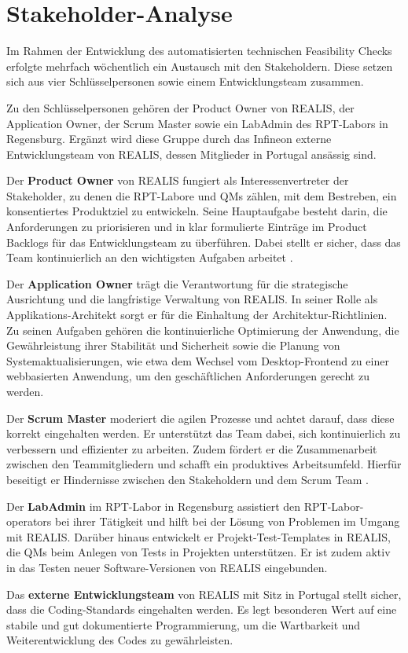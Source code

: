 \section{Stakeholder-Analyse}
Im Rahmen der Entwicklung des automatisierten technischen Feasibility Checks erfolgte mehrfach wöchentlich ein Austausch mit den Stakeholdern. Diese setzen sich aus vier Schlüsselpersonen sowie einem Entwicklungsteam zusammen.

Zu den Schlüsselpersonen gehören der Product Owner von \gls{REALIS}, der Application Owner, der Scrum Master sowie ein LabAdmin des \gls{RPT}-Labors in Regensburg. Ergänzt wird diese Gruppe durch das Infineon externe Entwicklungsteam von \gls{REALIS}, dessen Mitglieder in Portugal ansässig sind.

Der \textbf{Product Owner} von \gls{REALIS} fungiert als Interessenvertreter der Stakeholder, zu denen die \gls{RPT}-Labore und \glspl{QM} zählen, mit dem Bestreben, ein konsentiertes Produktziel zu entwickeln. Seine Hauptaufgabe besteht darin, die Anforderungen zu priorisieren und in klar formulierte Einträge im Product Backlogs für das Entwicklungsteam zu überführen. Dabei stellt er sicher, dass das Team kontinuierlich an den wichtigsten Aufgaben arbeitet \cite{scrumguide2020}.

Der \textbf{Application Owner} trägt die Verantwortung für die strategische Ausrichtung und die langfristige Verwaltung von \gls{REALIS}. In seiner Rolle als Applikations-Architekt sorgt er für die Einhaltung der Architektur-Richtlinien. Zu seinen Aufgaben gehören die kontinuierliche Optimierung der Anwendung, die Gewährleistung ihrer Stabilität und Sicherheit sowie die Planung von Systemaktualisierungen, wie etwa dem Wechsel vom Desktop-Frontend zu einer webbasierten Anwendung, um den geschäftlichen Anforderungen gerecht zu werden.

Der \textbf{Scrum Master} moderiert die agilen Prozesse und achtet darauf, dass diese korrekt eingehalten werden. Er unterstützt das Team dabei, sich kontinuierlich zu verbessern und effizienter zu arbeiten. Zudem fördert er die Zusammenarbeit zwischen den Teammitgliedern und schafft ein produktives Arbeitsumfeld. Hierfür beseitigt er Hindernisse zwischen den Stakeholdern und dem Scrum Team \cite{scrumguide2020}.

Der \textbf{LabAdmin} im \gls{RPT}-Labor in Regensburg assistiert den \gls{RPT}-Labor-\glspl{operator} bei ihrer Tätigkeit und hilft bei der Lösung von Problemen im Umgang mit \gls{REALIS}. Da\-rüber hinaus entwickelt er Projekt-Test-Templates in \gls{REALIS}, die \glspl{QM} beim Anlegen von Tests in Projekten unterstützen. Er ist zudem aktiv in das Testen neuer Software-Versionen von \gls{REALIS} eingebunden.


Das \textbf{externe Entwicklungsteam} von \gls{REALIS} mit Sitz in Portugal stellt sicher, dass die Coding-Standards eingehalten werden. Es legt besonderen Wert auf eine stabile und gut dokumentierte Programmierung, um die Wartbarkeit und Weiterentwicklung des Codes zu gewährleisten.